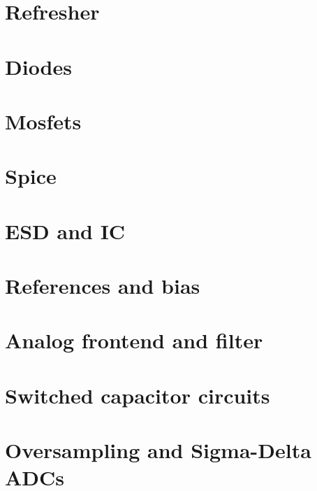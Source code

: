 \documentclass[11pt,twoside,openright]{kaobook}
\begin{document}
\setchapterpreamble[u]{\margintoc}
\chapter{Refresher}


\setchapterpreamble[u]{\margintoc}
\chapter{Diodes}


\setchapterpreamble[u]{\margintoc}
\chapter{Mosfets}


\setchapterpreamble[u]{\margintoc}
\chapter{Spice}


\setchapterpreamble[u]{\margintoc}
\chapter{ESD and IC}


\setchapterpreamble[u]{\margintoc}
\chapter{References and bias}


\setchapterpreamble[u]{\margintoc}
\chapter{Analog frontend and filter}

%
\setchapterpreamble[u]{\margintoc}
\chapter{Switched capacitor circuits}


\setchapterpreamble[u]{\margintoc}
\chapter{Oversampling and Sigma-Delta ADCs}

\end{document}
